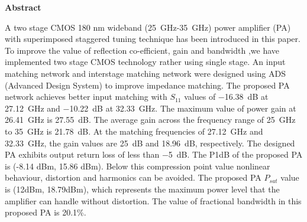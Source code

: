 
\begin{center}
    \Large{\textbf{Abstract}}
\end{center}
\vspace{1cm}
 A two stage CMOS 180 nm wideband (\SI{25}{\giga\hertz}-\SI{35}{\giga\hertz}) power amplifier (PA) with superimposed staggered tuning technique has been introduced in this paper. To improve the value of reflection co-efficient, gain and bandwidth ,we have implemented two stage CMOS technology rather using single stage. An input matching network and interstage matching network were designed using ADS (Advanced Design System) to improve impedance matching. The proposed PA network achieves better input matching with $S_{11}$ values of \SI{-16.38}{\deci\bel} at \SI{27.12}{\giga\hertz} and \SI{-10.22}{\deci\bel} at \SI{32.33}{\giga\hertz}. The maximum value of power gain at \SI{26.41}{\giga\hertz} is \SI{27.55}{\deci\bel}. The average gain across the frequency range of \SI{25}{\giga\hertz} to \SI{35}{\giga\hertz} is \SI{21.78}{\deci\bel}. At the matching frequencies of \SI{27.12}{\giga\hertz} and \SI{32.33}{\giga\hertz}, the gain values are \SI{25}{\deci\bel} and \SI{18.96}{\deci\bel}, respectively. The designed PA exhibits output return loss of less than \SI{-5}{\deci\bel}. The P1dB of the proposed PA is (-8.14 dBm, 15.86 dBm). Below this compression point value nonlinear behaviour, distortion and harmonics can be avoided. The proposed PA $P_{sat}$ value is (12dBm, 18.79dBm), which represents the maximum power level that the amplifier can handle without distortion. The value of fractional bandwidth in this proposed PA is 20.1\%.